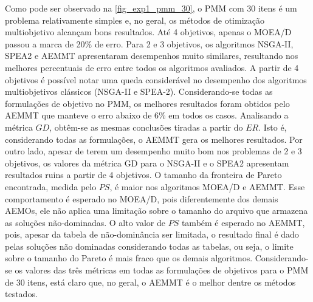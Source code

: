 Como pode ser observado na \autoref{fig_exp1_pmm_30}, o PMM com 30 itens é um problema relativamente simples e, no geral, os métodos de otimização multiobjetivo alcançam bons resultados. Até 4 objetivos, apenas o MOEA/D passou a marca de 20\% de erro. Para 2 e 3 objetivos, os algoritmos NSGA-II, SPEA2 e AEMMT apresentaram desempenhos muito similares, resultando nos melhores percentuais de erro entre todos os algoritmos avaliados. A partir de 4 objetivos é possível notar uma queda considerável no desempenho dos algoritmos multiobjetivos clássicos (NSGA-II e SPEA-2). Considerando-se todas as formulações de objetivo no PMM, os melhores resultados foram obtidos pelo AEMMT que manteve o erro abaixo de 6\% em todos os casos. Analisando a métrica $GD$, obtêm-se as mesmas conclusões tiradas a partir do $ER$. Isto é, considerando todas as formulações, o AEMMT gera os melhores resultados. Por outro lado, apesar de terem um desempenho muito bom nos problemas de 2 e 3 objetivos, os valores da métrica GD para o NSGA-II e o SPEA2 apresentam resultados ruins a partir de 4 objetivos. O tamanho da fronteira de Pareto encontrada, medida pelo $PS$, é maior nos algoritmos MOEA/D e AEMMT. Esse comportamento é esperado no MOEA/D, pois diferentemente dos demais AEMOs, ele não aplica uma limitação sobre o tamanho do arquivo que armazena as soluções não-dominadas. O alto valor de $PS$ também é esperado no AEMMT, pois, apesar da tabela de não-dominância ser limitada, o resultado final é dado pelas soluções não dominadas considerando todas as tabelas, ou seja, o limite sobre o tamanho do Pareto é mais fraco que os demais algoritmos. Considerando-se os valores das três métricas em todas as formulações de objetivos para o PMM de 30 itens, está claro que, no geral, o AEMMT é o melhor dentre os métodos testados.


